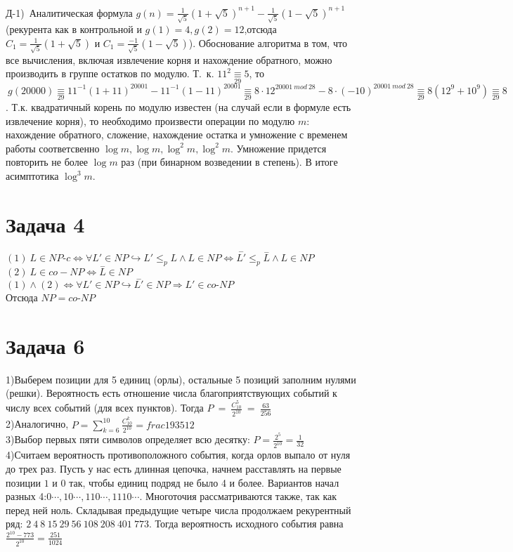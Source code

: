 \documentclass[a4paper,12pt]{article} %
\begin{document}
Д-1)~Аналитическая формула $g(n)= \frac{1}{\sqrt{5}}(1+\sqrt{5})^{n+1} - \frac{1}{\sqrt{5}}(1-\sqrt{5})^{n+1}$ (рекурента как в контрольной и $g(1) = 4, g(2) = 12 $,отсюда $C_1 =\frac{1}{\sqrt{5}}(1+\sqrt{5})$ и $C_1 =\frac{-1}{\sqrt{5}}(1-\sqrt{5})$). Обоснование алгоритма в том, что все вычисления, включая извлечение корня и нахождение обратного, можно производить в группе остатков по модулю. Т.~к. $11^2 \underset{29} \equiv 5$, то$~g(20000) \underset{29} \equiv 11^{-1}(1+11)^{20001}-11^{-1}(1-11)^{20001}\underset{29} \equiv 8\cdot 12^{20001~mod~28}- 8\cdot (-10)^{20001~mod~28} \underset{29} \equiv 8(12^9+10^9) \underset{29} \equiv 8$. Т.к. квадратичный корень по модулю известен (на случай если в формуле есть извлечение корня), то необходимо произвести операции по модулю $m$: нахождение обратного, сложение, нахождение остатка и умножение с временем работы соответсвенно $\log{m}, \log{m}, \log^2{m},\log^2{m}$. Умножение придется повторить не более $\log{m}$ раз (при бинарном возведении в степень). В итоге асимптотика $\log^3{m}$.\\
   
   \section*{Задача 4}
$(1)~L \in NP\text{-}c \Leftrightarrow \forall L' \in NP \hookrightarrow L' \leq_p L \wedge L \in NP \Leftrightarrow \overset{-}{L'} \leq_p \overset{-}L \wedge L \in NP$ \\
$(2)~L \in co-NP \Leftrightarrow \overset{-}L \in NP$\\
$(1)\wedge(2) \Leftrightarrow \forall L' \in NP \hookrightarrow \overset{-}{L'} \in NP \Rightarrow L' \in co\text{-}NP$\\
Отсюда $NP = co\text{-}NP$

   \section*{Задача 6}
1)Выберем позиции для 5 единиц (орлы), остальные 5 позиций заполним нулями (решки). Вероятность есть отношение числа  благоприятствующих событий к числу всех событий (для всех пунктов). Тогда $P~=~\frac{C^{5}_{10}}{2^{10}}~=~\frac{63}{256}$\\
2)Аналогично, $P=\sum_{k=6}^{10}{\frac{C_{10}^k}{2^{10}}} = frac{193}{512}$\\
3)Выбор первых пяти символов определяет всю десятку: $P=\frac{2^5}{2^{10}}=\frac{1}{32}$\\
4)Считаем вероятность противоположного события, когда орлов выпало от нуля до трех раз. Пусть у нас есть длинная цепочка, начнем расставлять на первые позиции $1$ и $0$ так, чтобы единиц подряд не было 4 и более. Вариантов начал разных 4:$0\cdots, 10\cdots, 110\cdots, 1110\cdots$. Многоточия рассматриваются также, так как перед ней ноль. Складывая предыдущие четыре числа продолжаем рекурентный ряд: $2~4~8~15~29~56~108~208~401~773 
$. Тогда вероятность исходного события равна $\frac{2^{10}-773}{2^{10}} = \frac{251}{1024}$\\
\end{document}
